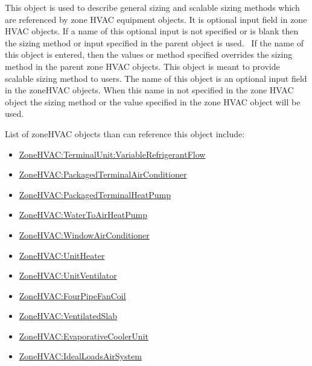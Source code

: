 This object is used to describe general sizing and scalable sizing methods which are referenced by zone HVAC equipment objects. It is optional input field in zone HVAC objects. If a name of this optional input is not specified or is blank then the sizing method or input specified in the parent object is used.~ If the name of this object is entered, then the values or method specified overrides the sizing method in the parent zone HVAC objects. This object is meant to provide scalable sizing method to users. The name of this object is an optional input field in the zoneHVAC objects. When this name in not specified in the zone HVAC object the sizing method or the value specified in the zone HVAC object will be used.

List of zoneHVAC objects than can reference this object include:

\begin{itemize}
\item
  \hyperref[zonehvacterminalunitvariablerefrigerantflow]{ZoneHVAC:TerminalUnit:VariableRefrigerantFlow}
\item
  \hyperref[zonehvacpackagedterminalairconditioner]{ZoneHVAC:PackagedTerminalAirConditioner}
\item
  \hyperref[zonehvacpackagedterminalheatpump]{ZoneHVAC:PackagedTerminalHeatPump}
\item
  \hyperref[zonehvacwatertoairheatpump]{ZoneHVAC:WaterToAirHeatPump}
\item
  \hyperref[zonehvacwindowairconditioner]{ZoneHVAC:WindowAirConditioner}
\item
  \hyperref[zonehvacunitheater]{ZoneHVAC:UnitHeater}
\item
  \hyperref[zonehvacunitventilator]{ZoneHVAC:UnitVentilator}
\item
  \hyperref[zonehvacfourpipefancoil]{ZoneHVAC:FourPipeFanCoil}
\item
  \hyperref[zonehvacventilatedslab]{ZoneHVAC:VentilatedSlab}
\item
  \hyperref[zonehvacevaporativecoolerunit]{ZoneHVAC:EvaporativeCoolerUnit}
\item
  \hyperref[zonehvacidealloadsairsystem]{ZoneHVAC:IdealLoadsAirSystem}
\end{itemize}

